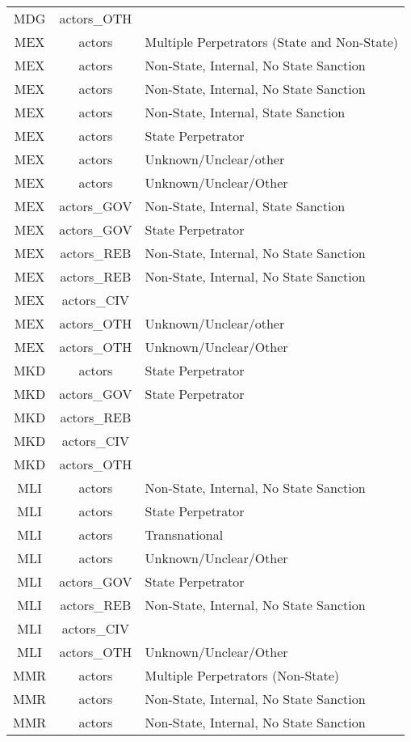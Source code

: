 \documentclass[12pt]{article}
\begin{document}
\begin{center}
\begin{longtable}{|c|c|p{10cm}|}
  MDG & actors\_OTH &  \\ 
  MEX & actors & Multiple Perpetrators (State and Non-State) \\ 
  MEX & actors & Non-State, Internal, No State Sanction \\ 
  MEX & actors & Non-State, Internal, No State Sanction \\ 
  MEX & actors & Non-State, Internal, State Sanction \\ 
  MEX & actors & State Perpetrator \\ 
  MEX & actors & Unknown/Unclear/other \\ 
  MEX & actors & Unknown/Unclear/Other \\ 
  MEX & actors\_GOV & Non-State, Internal, State Sanction \\ 
  MEX & actors\_GOV & State Perpetrator \\ 
  MEX & actors\_REB & Non-State, Internal, No State Sanction \\ 
  MEX & actors\_REB & Non-State, Internal, No State Sanction \\ 
  MEX & actors\_CIV &  \\ 
  MEX & actors\_OTH & Unknown/Unclear/other \\ 
  MEX & actors\_OTH & Unknown/Unclear/Other \\ 
  MKD & actors & State Perpetrator \\ 
  MKD & actors\_GOV & State Perpetrator \\ 
  MKD & actors\_REB &  \\ 
  MKD & actors\_CIV &  \\ 
  MKD & actors\_OTH &  \\ 
  MLI & actors & Non-State, Internal, No State Sanction \\ 
  MLI & actors & State Perpetrator \\ 
  MLI & actors & Transnational \\ 
  MLI & actors & Unknown/Unclear/Other \\ 
  MLI & actors\_GOV & State Perpetrator \\ 
  MLI & actors\_REB & Non-State, Internal, No State Sanction \\ 
  MLI & actors\_CIV &  \\ 
  MLI & actors\_OTH & Unknown/Unclear/Other \\ 
  MMR & actors & Multiple Perpetrators (Non-State) \\ 
  MMR & actors & Non-State, Internal, No State Sanction \\ 
  MMR & actors & Non-State, Internal, No State Sanction \\ 

\end{longtable}
\end{center}
\end{document}
